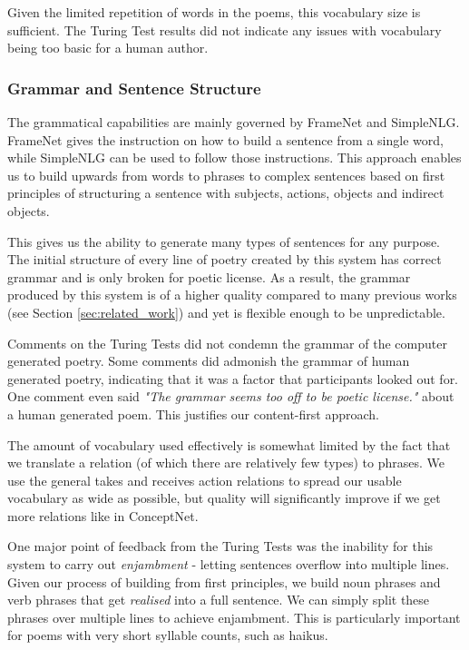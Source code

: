 Given the limited repetition of words in the poems, this vocabulary size is sufficient. The Turing Test results did not indicate any issues with vocabulary being too basic for a human author.

\subsubsection{Grammar and Sentence Structure}
The grammatical capabilities are mainly governed by FrameNet and SimpleNLG. FrameNet gives the instruction on how to build a sentence from a single word, while SimpleNLG can be used to follow those instructions. This approach enables us to build upwards from words to phrases to complex sentences based on first principles of structuring a sentence with subjects, actions, objects and indirect objects.

This gives us the ability to generate many types of sentences for any purpose. The initial structure of every line of poetry created by this system has correct grammar and is only broken for poetic license. As a result, the grammar produced by this system is of a higher quality compared to many previous works (see Section \ref{sec:related_work}) and yet is flexible enough to be unpredictable.

Comments on the Turing Tests did not condemn the grammar of the computer generated poetry. Some comments did admonish the grammar of human generated poetry, indicating that it was a factor that participants looked out for. One comment even said \textit{"The grammar seems too off to be poetic license."} about a human generated poem. This justifies our content-first approach.

The amount of vocabulary used effectively is somewhat limited by the fact that we translate a relation (of which there are relatively few types) to phrases. We use the general takes and receives action relations to spread our usable vocabulary as wide as possible, but quality will significantly improve if we get more relations like in ConceptNet\cite{liu2004conceptnet}.

One major point of feedback from the Turing Tests was the inability for this system to carry out \textit{enjambment} - letting sentences overflow into multiple lines. Given our process of building from first principles, we build noun phrases and verb phrases that get \textit{realised} into a full sentence. We can simply split these phrases over multiple lines to achieve enjambment. This is particularly important for poems with very short syllable counts, such as haikus. 


